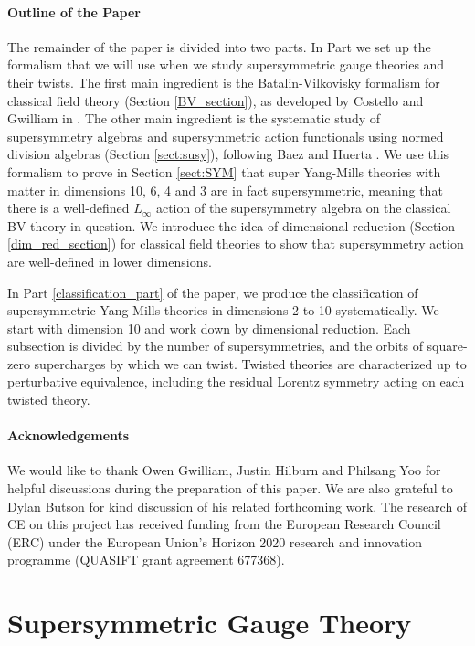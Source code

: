 \documentclass[10pt, oneside]{article}
\begin{document}
\subsection*{Outline of the Paper}
The remainder of the paper is divided into two parts.  In Part \ref{formalism_part} we set up the formalism that we will use when we study supersymmetric gauge theories and their twists.  The first main ingredient is the Batalin-Vilkovisky formalism \cite{BatalinVilkovisky} for classical field theory (Section \ref{BV_section}), as developed by Costello and Gwilliam in \cite{CostelloBook, Book1, Book2}.  The other main ingredient is the systematic study of supersymmetry algebras and supersymmetric action functionals using normed division algebras (Section \ref{sect:susy}), following Baez and Huerta \cite{BaezHuerta}.  We use this formalism to prove in Section \ref{sect:SYM} that super Yang-Mills theories with matter in dimensions 10, 6, 4 and 3 are in fact supersymmetric, meaning that there is a well-defined $L_\infty$ action of the supersymmetry algebra on the classical BV theory in question.  We introduce the idea of dimensional reduction (Section \ref{dim_red_section}) for classical field theories to show that supersymmetry action are well-defined in lower dimensions.

In Part \ref{classification_part} of the paper, we produce the classification of supersymmetric Yang-Mills theories in dimensions 2 to 10 systematically.  We start with dimension 10 and work down by dimensional reduction.  Each subsection is divided by the number of supersymmetries, and the orbits of square-zero supercharges by which we can twist.  Twisted theories are characterized up to perturbative equivalence, including the residual Lorentz symmetry acting on each twisted theory.

\subsection*{Acknowledgements}
We would like to thank Owen Gwilliam, Justin Hilburn and Philsang Yoo for helpful discussions during the preparation of this paper.  We are also grateful to Dylan Butson for kind discussion of his related forthcoming work.  The research of CE on this project has received funding from the European Research Council (ERC) under the European Union's Horizon 2020 research and innovation programme (QUASIFT grant agreement 677368).

\part{Supersymmetric Gauge Theory} \label{formalism_part}
\end{document}
